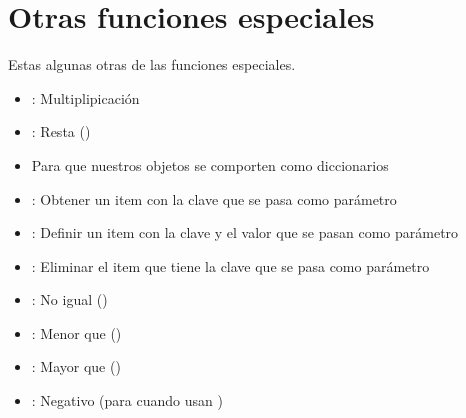 \documentclass[a5paper,9pt,spanish]{sphinxmanual}
\begin{document}
\chapter{Otras funciones especiales}
\label{\detokenize{class-extras:otras-funciones-especiales}}
\sphinxAtStartPar
Estas algunas otras de las funciones especiales.
\begin{itemize}
\item {} 
\sphinxAtStartPar
{}: Multiplipicación

\item {} 
\sphinxAtStartPar
{}: Resta ()

\item {} 
\sphinxAtStartPar
Para que nuestros objetos se comporten como diccionarios

\end{itemize}
\begin{itemize}
\item {} 
\sphinxAtStartPar
{}: Obtener un item con la clave que se pasa como parámetro

\item {} 
\sphinxAtStartPar
{}: Definir un item con la clave y el valor que se pasan como parámetro

\item {} 
\sphinxAtStartPar
{}: Eliminar el item que tiene la clave que se pasa como parámetro

\end{itemize}
\begin{itemize}
\item {} 
\sphinxAtStartPar
{}: No igual () \sphinxcode{\sphinxupquote{!=}}

\item {} 
\sphinxAtStartPar
{}: Menor que () \sphinxcode{\sphinxupquote{\textless{}}}

\item {} 
\sphinxAtStartPar
{}: Mayor que () \sphinxcode{\sphinxupquote{\textgreater{}}}

\item {} 
\sphinxAtStartPar
{}: Negativo (para cuando usan )

\end{itemize}
\end{document}
